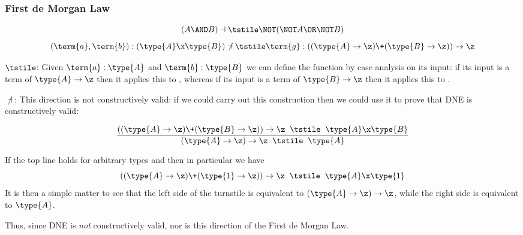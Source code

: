\subsubsection{First de Morgan Law}
\begin{Theorem}
\[
(A \AND B)
\dashv \tstile 
\NOT(\NOT A \OR \NOT B)
\]
\[
(\term{a},\term{b}):(\type{A} \x \type{B})
\not\dashv \tstile 
\term{g}:((\type{A} \to \z) \+ (\type{B} \to \z)) \to \z
\]
\end{Theorem}
\begin{Proof}
$\tstile$: Given $\term{a}:\type{A}$ and $\term{b}:\type{B}$ we can define the function  by case analysis on its input: if its input is a term of $\type{A} \to \z$ then it applies this to , whereas if its input is a term of $\type{B} \to \z$ then it applies this to .

$\not\dashv$: This direction is not constructively valid: if we could carry out this construction then we could use it to prove that DNE is constructively valid:

\begin{Lemma}
\[
\frac{
((\type{A} \to \z) \+ (\type{B} \to \z)) \to \z
\;\;\tstile \;\;
\type{A} \x \type{B}
}{
(\type{A} \to \z) \to \z
\;\; \tstile \;\; 
\type{A}
}
\]
\end{Lemma}
\begin{Proof}
If the top line holds for arbitrary types  and  then in particular we have 
\[
((\type{A} \to \z) \+ (\type{1} \to \z)) \to \z
\;\;\tstile \;\;
\type{A} \x \type{1}
\]
It is then a simple matter to see that the left side of the turnstile is equivalent to $(\type{A} \to \z) \to \z$, while the right side is equivalent to $\type{A}$.
\end{Proof}
Thus, since DNE is \emph{not} constructively valid, nor is this direction of the First de Morgan Law.

\end{Proof}



